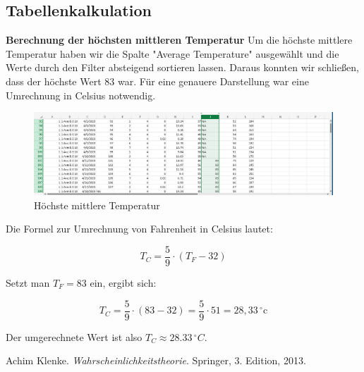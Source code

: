 \documentclass[a4paper,12pt]{article}
\begin{document}
\subsection{Tabellenkalkulation}
\textbf{Berechnung der höchsten mittleren Temperatur}
Um die höchste mittlere Temperatur haben wir die Spalte "Average Temperature" ausgewählt und die Werte durch den Filter absteigend sortieren lassen. Daraus konnten wir schließen, dass der höchste Wert 83 war. Für eine genauere Darstellung war eine Umrechnung in Celsius notwendig.  

\begin{figure}[h]
    \centering
    \includegraphics[width=1\linewidth]{excel2.png}
    \caption{Höchste mittlere Temperatur}
    \label{fig:enter-label}
\end{figure}

Die Formel zur Umrechnung von Fahrenheit in Celsius lautet:

\[
T_C = \frac{5}{9} \cdot (T_F - 32)
\]

Setzt man \(T_F = 83\) ein, ergibt sich:

\[
T_C = \frac{5}{9} \cdot (83 - 32) = \frac{5}{9} \cdot 51 = 28{,}33 \,
^\circ\text{c}
\]



Der umgerechnete Wert ist also \(T_C \approx 28.33 \, ^\circ C\).
\newpage
\begin{thebibliography}{9}
 Achim Klenke.
\textit{Wahrscheinlichkeitstheorie}. Springer, 3. Edition, 2013.
\end{thebibliography}
\end{document}
